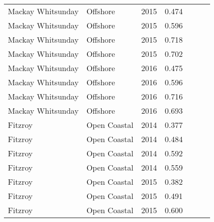 {\begin{longtable}{llccccc}
  Mackay Whitsunday & Offshore & 2015 & 0.474 & \cellcolor[HTML]{F47721}{D} & \cellcolor[HTML]{F0C918}{C} & \cellcolor[HTML]{F47721}{D} \\ 
  Mackay Whitsunday & Offshore & 2015 & 0.596 & \cellcolor[HTML]{F0C918}{C} & \cellcolor[HTML]{F0C918}{C} & \cellcolor[HTML]{F0C918}{C} \\ 
  Mackay Whitsunday & Offshore & 2015 & 0.718 & \cellcolor[HTML]{B0D235}{B} & \cellcolor[HTML]{B0D235}{B} & \cellcolor[HTML]{B0D235}{B} \\ 
  Mackay Whitsunday & Offshore & 2015 & 0.702 & \cellcolor[HTML]{B0D235}{B} & \cellcolor[HTML]{B0D235}{B} & \cellcolor[HTML]{B0D235}{B} \\ 
  Mackay Whitsunday & Offshore & 2016 & 0.475 & \cellcolor[HTML]{F47721}{D} & \cellcolor[HTML]{F0C918}{C} & \cellcolor[HTML]{F47721}{D} \\ 
  Mackay Whitsunday & Offshore & 2016 & 0.596 & \cellcolor[HTML]{F0C918}{C} & \cellcolor[HTML]{F0C918}{C} & \cellcolor[HTML]{F0C918}{C} \\ 
  Mackay Whitsunday & Offshore & 2016 & 0.716 & \cellcolor[HTML]{B0D235}{B} & \cellcolor[HTML]{B0D235}{B} & \cellcolor[HTML]{B0D235}{B} \\ 
  Mackay Whitsunday & Offshore & 2016 & 0.693 & \cellcolor[HTML]{B0D235}{B} & \cellcolor[HTML]{B0D235}{B} & \cellcolor[HTML]{B0D235}{B} \\ 
  Fitzroy & Open Coastal & 2014 & 0.377 & \cellcolor[HTML]{F47721}{D} & \cellcolor[HTML]{F47721}{D} & \cellcolor[HTML]{F47721}{D} \\ 
  Fitzroy & Open Coastal & 2014 & 0.484 & \cellcolor[HTML]{F47721}{D} & \cellcolor[HTML]{F0C918}{C} & \cellcolor[HTML]{F47721}{D} \\ 
  Fitzroy & Open Coastal & 2014 & 0.592 & \cellcolor[HTML]{F0C918}{C} & \cellcolor[HTML]{F0C918}{C} & \cellcolor[HTML]{F0C918}{C} \\ 
  Fitzroy & Open Coastal & 2014 & 0.559 & \cellcolor[HTML]{F0C918}{C} & \cellcolor[HTML]{F0C918}{C} & \cellcolor[HTML]{F0C918}{C} \\ 
  Fitzroy & Open Coastal & 2015 & 0.382 & \cellcolor[HTML]{F47721}{D} & \cellcolor[HTML]{F47721}{D} & \cellcolor[HTML]{F47721}{D} \\ 
  Fitzroy & Open Coastal & 2015 & 0.491 & \cellcolor[HTML]{F47721}{D} & \cellcolor[HTML]{F0C918}{C} & \cellcolor[HTML]{F47721}{D} \\ 
  Fitzroy & Open Coastal & 2015 & 0.600 & \cellcolor[HTML]{F0C918}{C} & \cellcolor[HTML]{B0D235}{B} & \cellcolor[HTML]{F0C918}{C} \\ 

\end{longtable}}
